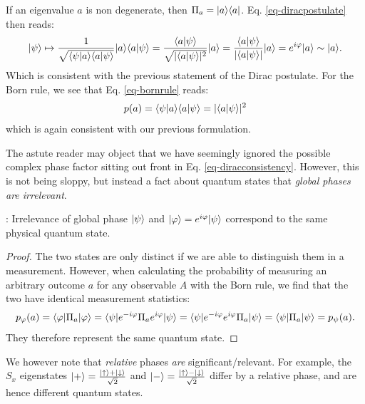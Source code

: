 If an eigenvalue $a$ is non degenerate, then $\Pi_a = \lvert a \rangle \langle a \rvert$. Eq. \eqref{eq-diracpostulate} then reads:
\begin{equation}\label{eq-diracconsistency}
    \ket{\psi} \mapsto \frac{1}{\sqrt{\braket{\psi}{a}\braket{a}{\psi}}}\ket{a}\braket{a}{\psi} = \frac{\braket{a}{\psi}}{\sqrt{\abs{\braket{a}{\psi}}^2}}\ket{a} = \frac{\braket{a}{\psi}}{\abs{\braket{a}{\psi}}} \ket{a} = e^{i\varphi}\ket{a} \sim \ket{a}.
\end{equation}
Which is consistent with the previous statement of the Dirac postulate. For the Born rule, we see that Eq. \eqref{eq-bornrule} reads:
\begin{equation}
    p(a) = \langle \psi \lvert a \rangle\langle a \lvert \psi \rangle = \lvert \langle a \lvert \psi \rangle \rvert^2
\end{equation}
which is again consistent with our previous formulation.

The astute reader may object that we have seemingly ignored the possible complex phase factor sitting out front in Eq. \eqref{eq-diracconsistency}. However, this is not being sloppy, but instead a fact about quantum states that \emph{global phases are irrelevant}.

\begin{thmbox}{: Irrelevance of global phase}
    $\lvert \psi \rangle$ and $\ket{\phi} = e^{i\varphi}\ket{\psi}$ correspond to the same physical quantum state.    
\end{thmbox}
\begin{proof}
    The two states are only distinct if we are able to distinguish them in a measurement. However, when calculating the probability of measuring an arbitrary outcome $a$ for any observable $A$ with the Born rule, we find that the two have identical measurement statistics:
    \begin{equation}
        p_{\phi}(a) = \bra{\phi}\Pi_a\ket{\phi} = \bra{\psi}e^{-i\varphi}\Pi_a e^{i\varphi}\ket{\psi} = \bra{\psi}e^{-i\varphi}e^{i\varphi}\Pi_a\ket{\psi} = \bra{\psi}\Pi_a\ket{\psi} = p_\psi(a).
    \end{equation}
    They therefore represent the same quantum state.
\end{proof}

We however note that \emph{relative} phases \emph{are} significant/relevant. For example, the $S_x$ eigenstates $\lvert + \rangle = \frac{\lvert \uparrow \rangle + \lvert \downarrow \rangle}{\sqrt{2}}$ and $\lvert - \rangle = \frac{\lvert \uparrow \rangle - \lvert \downarrow \rangle}{\sqrt{2}}$ differ by a relative phase, and are hence different quantum states.


